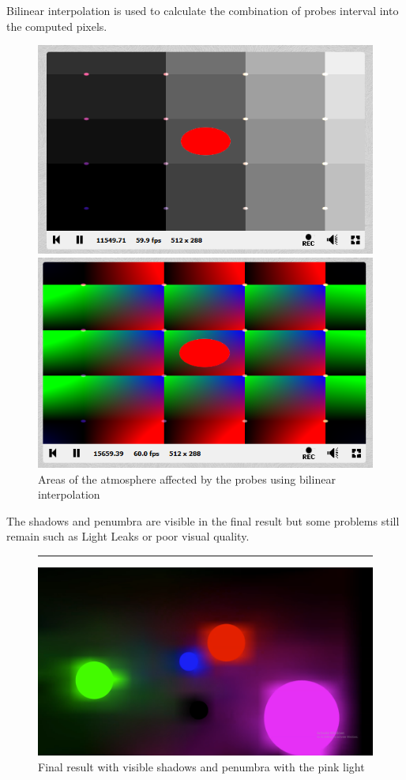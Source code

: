 \documentclass{rapportCS}
\begin{document}
Bilinear interpolation is used to calculate the combination of probes interval into the computed pixels.



\begin{figure}[!htb]
   \begin{minipage}{0.48\textwidth}
     \centering
     \includegraphics[width=.7\linewidth]{figures/shadertoy/shadertoy_bilerp.png}
   \end{minipage}\hfill
   \begin{minipage}{0.48\textwidth}
     \centering
     \includegraphics[width=.7\linewidth]{figures/shadertoy/shadertoy_bilerp_2.png}
   \end{minipage}
    \caption{Areas of the atmosphere affected by the probes using bilinear interpolation}
\end{figure}

The shadows and penumbra are visible in the final result but some problems still remain such as Light Leaks or poor visual quality.

\begin{figure}
\centering
\rule{1cm}{1cm}
\includegraphics[width=1\linewidth]{figures/shadertoy/shadertoy_final_cubic.png}
\caption{Final result with visible shadows and penumbra with the pink light}
\end{figure}
\end{document}
